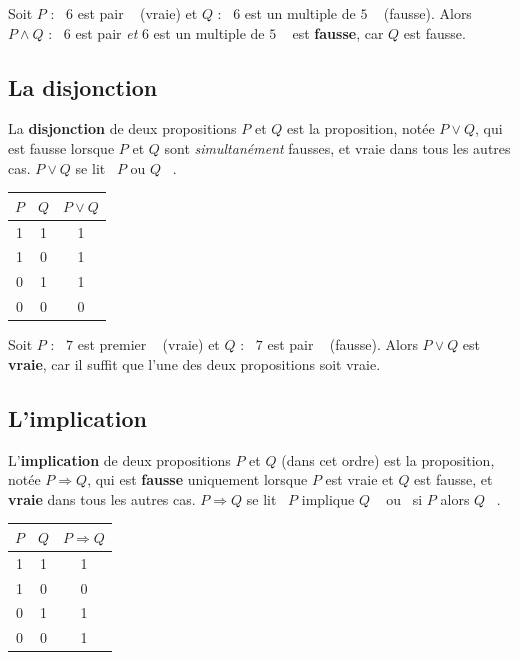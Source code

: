 \documentclass[a4paper,12pt,openany]{book}
\providecommand{\og}{\guillemotleft~}
\providecommand{\fg}{\ifhmode~\fi\guillemotright}
\begin{document}
\begin{exemple}
Soit $P$ : \og $6$ est pair \fg{} (vraie) et $Q$ : \og $6$ est un multiple de
$5$ \fg{} (fausse). Alors $P\wedge Q$ : \og $6$ est pair \emph{et} $6$ est un
multiple de $5$ \fg{} est \textbf{fausse}, car $Q$ est fausse.
\end{exemple}

\subsection{La disjonction}

\begin{definition}
La \textbf{disjonction} de deux propositions $P$ et $Q$ est la proposition,
notée $P\vee Q$, qui est fausse lorsque $P$ et $Q$ sont \emph{simultanément}
fausses, et vraie dans tous les autres cas. $P\vee Q$ se lit \og $P$ ou
$Q$ \fg.
\end{definition}

\begin{center}
\begin{tabular}{|c|c|c|}
\hline
$P$ & $Q$ & $P\vee Q$ \\
\hline
1 & 1 & 1 \\
1 & 0 & 1 \\
0 & 1 & 1 \\
0 & 0 & 0 \\
\hline
\end{tabular}
\end{center}


\begin{exemple}
Soit $P$ : \og $7$ est premier \fg{} (vraie) et $Q$ : \og $7$ est pair \fg{}
(fausse). Alors $P\vee Q$ est \textbf{vraie}, car il suffit que l'une des deux
propositions soit vraie.
\end{exemple}

\subsection{L'implication}


\begin{definition}
L'\textbf{implication} de deux propositions $P$ et $Q$ (dans cet ordre) est la
proposition, notée $P\Rightarrow Q$, qui est \textbf{fausse} uniquement lorsque
$P$ est vraie et $Q$ est fausse, et \textbf{vraie} dans tous les autres cas.
$P\Rightarrow Q$ se lit \og $P$ implique $Q$ \fg{} ou \og si $P$ alors $Q$ \fg.
\end{definition}

\begin{center}
\begin{tabular}{|c|c|c|}
\hline
$P$ & $Q$ & $P\Rightarrow Q$ \\
\hline
1 & 1 & 1 \\
1 & 0 & 0 \\
0 & 1 & 1 \\
0 & 0 & 1 \\
\hline
\end{tabular}
\end{center}
\end{document}

